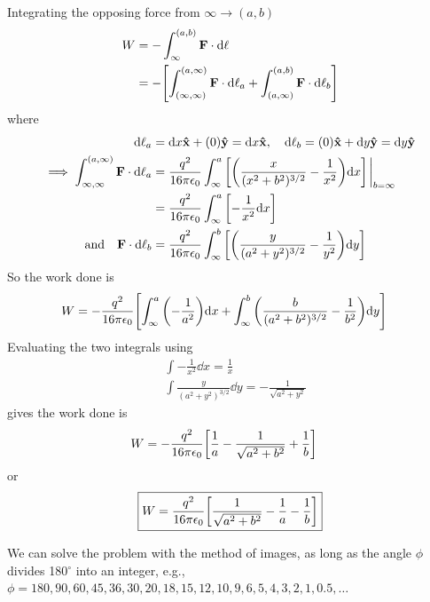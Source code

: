 \documentclass[../main.tex]{subfiles}
\begin{document}
Integrating the opposing force from $\infty \to (a,b)$ 
\begin{align*}
    W &= -\int_\infty^{(a, b)} \vb F \cdot \dd\ell \\
    &= - \qt[\int_{(\infty, \infty)}^{(a, \infty)} \vb F \cdot \dd \ell_a + \int_{(a, \infty)}^{(a, b)} \vb F \cdot \dd \ell_b]
\end{align*}
where
\begin{align*}
    \dd \ell_a &= \dd x \vu x + (0) \vu y = \dd x \vu x, \quad \dd \ell_b = (0) \vu x + \dd y \vu y = \dd y \vu y \\
    \implies \int_{\infty, \infty}^{(a,\infty)}\vb F \cdot \dd \ell_a &= \frac{q^2}{16 \pi \epsilon_0} \int_\infty^a \qt[
        \qt(\frac{x}{(x^2 + b^2)^{3/2}} - \frac{1}{x^2}) \dd x 
    ] \eval_{b = \infty} \\
    &= \frac{q^2}{16 \pi \epsilon_0} \int_\infty^a \qt[
        -\frac{1}{x^2} \dd x
    ] \\
    \qand \vb F \cdot \dd \ell_b &= \frac{q^2}{16 \pi \epsilon_0} \int_\infty^b \qt[
        \qt(\frac{y}{(a^2 + y^2)^{3/2}} - \frac{1}{y^2}) \dd y
    ]
\end{align*}
So the work done is
\begin{align*}
    W &= -\frac{q^2}{16\pi \epsilon_0} \qt[ \int_\infty^a 
        \qt(- \frac{1}{a^2}) \dd x
        + \int_\infty^b \qt(\frac{b}{(a^2 + b^2)^{3/2}} - \frac{1}{b^2}) \dd y
    ]
\end{align*}
Evaluating the two integrals using 
\begin{align*}
    &\int -\frac{1}{x^2} \dd x = \frac{1}{x} \\
    &\int \frac{y}{(a^2 + y^2)^{3/2}} \dd y = -\frac{1}{\sqrt{a^2 + y^2}}
\end{align*}
gives the work done is
\begin{align*}
    W &= -\frac{q^2}{16\pi \epsilon_0} \qt[
        \frac{1}{a} - \frac{1}{\sqrt{a^2 + b^2}}  + \frac{1}{b}
    ]
\end{align*}
or
\begin{align*}
    \boxed{
        W = \frac{q^2}{16\pi \epsilon_0} \qt[
            \frac{1}{\sqrt{a^2 + b^2}} - \frac{1}{a} - \frac{1}{b}
        ]
    }
\end{align*}

\newpage
We can solve the problem with the method of images, as long as the angle $\phi$ divides 180$^\circ$ into an integer,
e.g., $\phi = 180, 90, 60, 45, 36, 30, 20, 18, 15, 12, 10, 9, 6, 5, 4, 3, 2, 1, 0.5, \dots$
\end{document}
